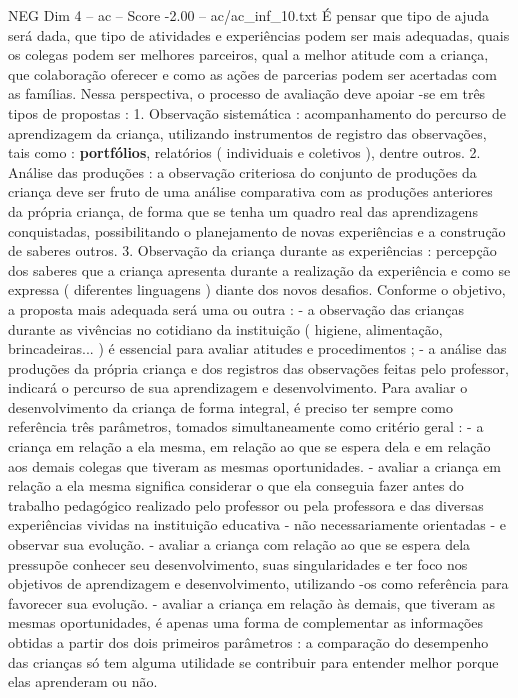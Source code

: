 \begin{textsample}{NEG Dim 4 – ac – Score -2.00 – ac/ac\_inf\_10.txt}
É pensar que tipo de ajuda será dada, que tipo de atividades e experiências podem ser mais adequadas, quais os colegas podem ser melhores parceiros, qual a melhor atitude com a criança, que colaboração oferecer e como as ações de parcerias podem ser acertadas com as famílias.
Nessa perspectiva, o processo de avaliação deve apoiar -se em três tipos de propostas : 1.
Observação sistemática : acompanhamento do percurso de aprendizagem da criança, utilizando instrumentos de registro das observações, tais como : \textbf{portfólios}, relatórios ( individuais e coletivos ), dentre outros. 2.
Análise das produções : a observação criteriosa do conjunto de produções da criança deve ser fruto de uma análise comparativa com as produções anteriores da própria criança, de forma que se tenha um quadro real das aprendizagens conquistadas, possibilitando o planejamento de novas experiências e a construção de saberes outros. 3.
Observação da criança durante as experiências : percepção dos saberes que a criança apresenta durante a realização da experiência e como se expressa ( diferentes linguagens ) diante dos novos desafios.
Conforme o objetivo, a proposta mais adequada será uma ou outra : - a observação das crianças durante as vivências no cotidiano da instituição ( higiene, alimentação, brincadeiras... ) é essencial para avaliar atitudes e procedimentos ; - a análise das produções da própria criança e dos registros das observações feitas pelo professor, indicará o percurso de sua aprendizagem e desenvolvimento.
Para avaliar o desenvolvimento da criança de forma integral, é preciso ter sempre como referência três parâmetros, tomados simultaneamente como critério geral : - a criança em relação a ela mesma, em relação ao que se espera dela e em relação aos demais colegas que tiveram as mesmas oportunidades. - avaliar a criança em relação a ela mesma significa considerar o que ela conseguia fazer antes do trabalho pedagógico realizado pelo professor ou pela professora e das diversas experiências vividas na instituição educativa - não necessariamente orientadas - e observar sua evolução. - avaliar a criança com relação ao que se espera dela pressupõe conhecer seu desenvolvimento, suas singularidades e ter foco nos objetivos de aprendizagem e desenvolvimento, utilizando -os como referência para favorecer sua evolução. - avaliar a criança em relação às demais, que tiveram as mesmas oportunidades, é apenas uma forma de complementar as informações obtidas a partir dos dois primeiros parâmetros : a comparação do desempenho das crianças só tem alguma utilidade se contribuir para entender melhor porque elas aprenderam ou não.

\end{textsample}
